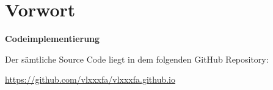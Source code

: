 \chapter*{Vorwort}
\blindtext\newline\newline
\textbf{Codeimplementierung}

Der sämtliche Source Code liegt in dem folgenden GitHub Repository:

\url{https://github.com/vlxxxfa/vlxxxfa.github.io}